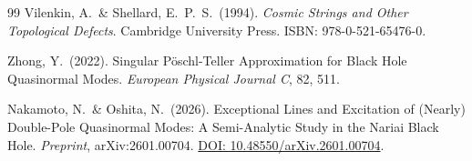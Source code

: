 \documentclass[aps,prd,twocolumn,superscriptaddress,nofootinbib]{revtex4-2}
\begin{document}
\begin{thebibliography}{99}
Vilenkin, A.\ \& Shellard, E.~P.~S.\ (1994).
\textit{Cosmic Strings and Other Topological Defects}.
Cambridge University Press. ISBN: 978-0-521-65476-0.

Zhong, Y.\ (2022).
Singular P\"oschl-Teller Approximation for Black Hole Quasinormal Modes.
\textit{European Physical Journal C}, 82, 511.

Nakamoto, N.\ \& Oshita, N.\ (2026).
Exceptional Lines and Excitation of (Nearly) Double-Pole Quasinormal Modes: A Semi-Analytic Study in the Nariai Black Hole.
\textit{Preprint}, arXiv:2601.00704.
\href{https://doi.org/10.48550/arXiv.2601.00704}{DOI: 10.48550/arXiv.2601.00704}.

\end{thebibliography}
\end{document}

